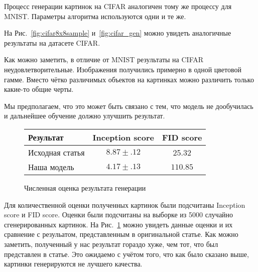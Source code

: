 \documentclass{article}
\begin{document}
Процесс генерации картинок на CIFAR аналогичен тому же процессу для MNIST.
Параметры алгоритма используются одни и те же.

На Рис.~\ref{fig:cifar8x8sample} и~\ref{fig:cifar_gen} можно увидеть
аналогичные результаты на датасете CIFAR.

Как можно заметить, в отличие от MNIST результаты на CIFAR
неудовлетворительные. Изображения получились примерно в одной цветовой гамме.
Вместо чётко различимых объектов на картинках можно различить только какие-то
общие черты.  

Мы предполагаем, что это может быть связано с тем, что модель не дообучилась и
дальнейшее обучение должно улучшить результат.

\begin{figure}
\begin{center}
    \begin{tabular}{|l||c|c|}
        \hline
        Результат & Inception score & FID score \\ 
        \hline
        Исходная статья & $8.87\pm.12$ & 25.32 \\
        \hline
        Наша модель & $4.17\pm.13$ & $110.85$ \\
        \hline
    \end{tabular}
\end{center}
\caption{Численная оценка результата генерации}\label{fig:cifar_scores}
\end{figure}

Для количественной оценки полученных картинок были подсчитаны Inception score и
FID score.  Оценки были подсчитаны на выборке из 5000 случайно сгенерированных
картинок. На Рис.~\ref{fig:cifar_scores} можно увидеть данные оценки и их
сравнение с резульатом, представленным в оригинальной статье. Как можно
заметить, полученный у нас результат гораздо хуже, чем тот, что был представлен
в статье. Это ожидаемо с учётом того, что как было сказано выше, картинки
генерируются не лучшего качества.

 
 
\end{document}
